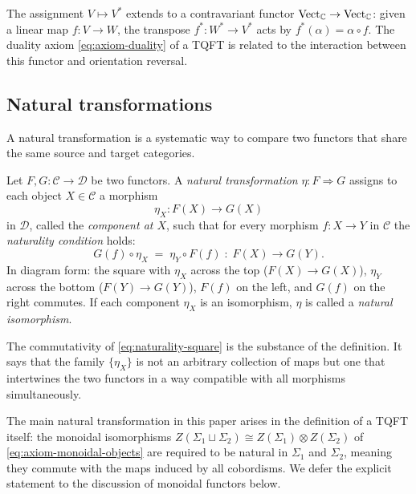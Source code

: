 \begin{example}\label{ex:dual-space-functor}
The assignment $V \mapsto V^*$ extends to a contravariant functor $\mathrm{Vect}_{\mathbb{C}} \to \mathrm{Vect}_{\mathbb{C}}$: given a linear map $f : V \to W$, the transpose $f^* : W^* \to V^*$ acts by $f^*(\alpha) = \alpha \circ f$.  The duality axiom \eqref{eq:axiom-duality} of a TQFT is related to the interaction between this functor and orientation reversal.
\end{example}

\subsection{Natural transformations}\label{appsec:natural-transformations}

A natural transformation is a systematic way to compare two functors that share the same source and target categories.

\begin{definition}\label{def:natural-transformation}
Let $F, G : \mathcal{C} \to \mathcal{D}$ be two functors.  A \emph{natural transformation} $\eta : F \Rightarrow G$ assigns to each object $X \in \mathcal{C}$ a morphism
\begin{equation}\label{eq:nat-trans-component}
\eta_X : F(X) \longrightarrow G(X)
\end{equation}
in $\mathcal{D}$, called the \emph{component at $X$}, such that for every morphism $f : X \to Y$ in $\mathcal{C}$ the \emph{naturality condition} holds:
\begin{equation}\label{eq:naturality-square}
G(f) \circ \eta_X \;=\; \eta_Y \circ F(f) \;:\; F(X) \longrightarrow G(Y).
\end{equation}
In diagram form: the square with $\eta_X$ across the top ($F(X) \to G(X)$), $\eta_Y$ across the bottom ($F(Y) \to G(Y)$), $F(f)$ on the left, and $G(f)$ on the right commutes.  If each component $\eta_X$ is an isomorphism, $\eta$ is called a \emph{natural isomorphism}.
\end{definition}

\noindent The commutativity of \eqref{eq:naturality-square} is the substance of the definition.  It says that the family $\{\eta_X\}$ is not an arbitrary collection of maps but one that intertwines the two functors in a way compatible with all morphisms simultaneously.

The main natural transformation in this paper arises in the definition of a TQFT itself: the monoidal isomorphisms $Z(\Sigma_1 \sqcup \Sigma_2) \cong Z(\Sigma_1) \otimes Z(\Sigma_2)$ of \eqref{eq:axiom-monoidal-objects} are required to be natural in $\Sigma_1$ and $\Sigma_2$, meaning they commute with the maps induced by all cobordisms.  We defer the explicit statement to the discussion of monoidal functors below.

